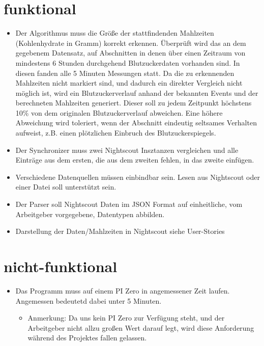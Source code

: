 \documentclass[accentcolor=tud0b,12pt,paper=a4]{tudreport}
\begin{document}
	\section{funktional}
\begin{itemize}
	\item Der Algorithmus muss die Größe der stattfindenden Mahlzeiten (Kohlenhydrate in Gramm) korrekt erkennen. 
	 Überprüft wird das an dem gegebenem Datensatz, auf Abschnitten in denen über einen Zeitraum von mindestens 6 Stunden durchgehend Blutzuckerdaten vorhanden sind. In diesen fanden alle 5 Minuten Messungen statt. Da die zu erkennenden Mahlzeiten nicht markiert sind, und dadurch ein direkter Vergleich nicht möglich ist, wird ein Blutzuckerverlauf anhand der bekannten Events und der berechneten Mahlzeiten generiert. Dieser soll zu jedem Zeitpunkt höchstens 10\% von dem originalen Blutzuckerverlauf abweichen. Eine höhere Abweichung wird toleriert, wenn der Abschnitt eindeutig seltsames Verhalten aufweist, z.B. einen plötzlichen Einbruch des Blutzuckerspiegels.
	
\item Der Synchronizer muss zwei Nightscout Insztanzen vergleichen und alle Einträge aus dem ersten, die aus dem zweiten fehlen, in das zweite einfügen.

\item Verschiedene Datenquellen müssen einbindbar sein. Lesen aus Nightscout oder einer Datei soll unterstützt sein.

\item Der Parser soll Nightscout Daten im JSON Format auf einheitliche, vom Arbeitgeber vorgegebene, Datentypen abbilden.



\item Darstellung der Daten/Mahlzeiten in Nightscout siehe User-Stories

\end{itemize}

	
	\section{nicht-funktional}
\begin{itemize}
	\item Das Programm muss auf einem PI Zero in angemessener Zeit laufen. Angemessen bedeutetd dabei unter 5 Minuten. 
	\begin{itemize}
	\item Anmerkung: Da uns kein PI Zero zur Verfügung steht, und der Arbeitgeber nicht allzu großen Wert darauf legt, wird diese Anforderung während des Projektes fallen gelassen. 
	\end{itemize}
	
\end{itemize}
\end{document}
